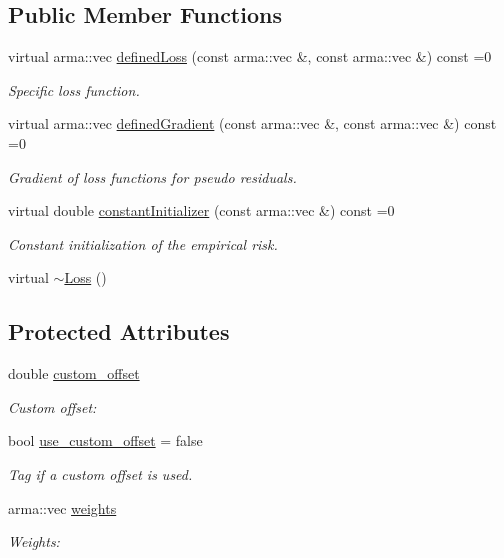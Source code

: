 \subsection*{Public Member Functions}
\begin{DoxyCompactItemize}
\item 
virtual arma\+::vec \mbox{\hyperlink{classloss_1_1_loss_ae9f94dd9b8311397583ba3a9cb485e94}{defined\+Loss}} (const arma\+::vec \&, const arma\+::vec \&) const =0
\begin{DoxyCompactList}\small\item\em Specific loss function. \end{DoxyCompactList}\item 
virtual arma\+::vec \mbox{\hyperlink{classloss_1_1_loss_a267a4de70747ade4b2d84ce35a448979}{defined\+Gradient}} (const arma\+::vec \&, const arma\+::vec \&) const =0
\begin{DoxyCompactList}\small\item\em Gradient of loss functions for pseudo residuals. \end{DoxyCompactList}\item 
virtual double \mbox{\hyperlink{classloss_1_1_loss_a65fe7dcd9370e6a549b8d1cc95fc8798}{constant\+Initializer}} (const arma\+::vec \&) const =0
\begin{DoxyCompactList}\small\item\em Constant initialization of the empirical risk. \end{DoxyCompactList}\item 
virtual \mbox{\hyperlink{classloss_1_1_loss_a868a7908fd97590b6c4fc69f4eb3c570}{$\sim$\+Loss}} ()
\end{DoxyCompactItemize}
\subsection*{Protected Attributes}
\begin{DoxyCompactItemize}
\item 
double \mbox{\hyperlink{classloss_1_1_loss_ae5dc373f54ed65ee0ca54a921ef826f4}{custom\+\_\+offset}}
\begin{DoxyCompactList}\small\item\em Custom offset\+: \end{DoxyCompactList}\item 
bool \mbox{\hyperlink{classloss_1_1_loss_a5fabbbb104e6f430498630130ac8a131}{use\+\_\+custom\+\_\+offset}} = false
\begin{DoxyCompactList}\small\item\em Tag if a custom offset is used. \end{DoxyCompactList}\item 
arma\+::vec \mbox{\hyperlink{classloss_1_1_loss_a4cfecaa4e3a6244ec82651607340e751}{weights}}
\begin{DoxyCompactList}\small\item\em Weights\+: \end{DoxyCompactList}\end{DoxyCompactItemize}


